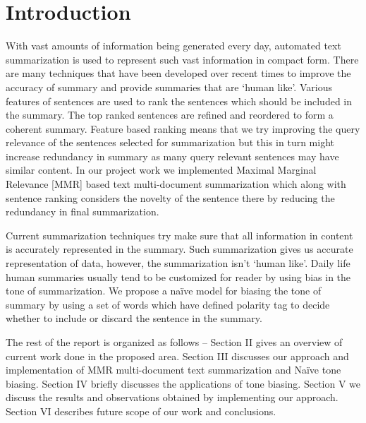 \documentclass[conference]{IEEEtran}
\begin{document}
\section{Introduction}
With vast amounts of information being generated every day, automated text summarization is used to represent such vast information in compact form. There are many techniques that have been developed over recent times to improve the accuracy of summary and provide summaries that are ‘human like’. Various features of sentences are used to rank the sentences which should be included in the summary. The top ranked sentences are refined and reordered to form a coherent summary. Feature based ranking means that we try improving the query relevance of the sentences selected for summarization but this in turn might increase redundancy in summary as many query relevant sentences may have similar content. In our project work we implemented Maximal Marginal Relevance [MMR] based text multi-document summarization which along with sentence ranking considers the novelty of the sentence there by reducing the redundancy in final summarization.
\par
Current summarization techniques try make sure that all information in content is accurately represented in the summary. Such summarization gives us accurate representation of data, however, the summarization isn’t ‘human like’.  Daily life human summaries usually tend to be customized for reader by using bias in the tone of summarization. We propose a naïve model for biasing the tone of summary by using a set of words which have defined polarity tag to decide whether to include or discard the sentence in the summary.
\par
The rest of the report is organized as follows –  Section II gives an overview of current work done in the proposed area. Section III discusses our approach and implementation of MMR multi-document text summarization and Naïve tone biasing. Section IV briefly discusses the applications of tone biasing. Section V we discuss the results and observations obtained by implementing our approach. Section VI describes future scope of our work and conclusions.




\end{document}
